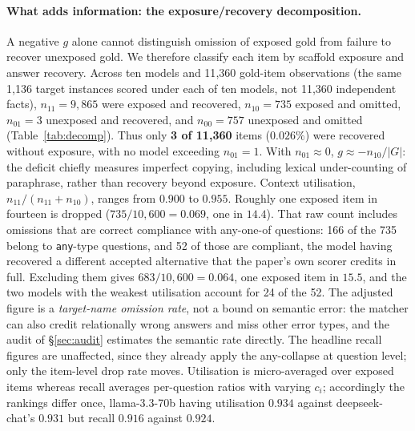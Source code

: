 \documentclass[10pt,twocolumn]{article}
\begin{document}
\paragraph{What adds information: the exposure/recovery decomposition.} A negative $g$ alone cannot distinguish omission of exposed gold from failure to recover unexposed gold. We therefore classify each item by scaffold exposure and answer recovery. Across ten models and 11{,}360 gold-item observations (the same 1{,}136 target instances scored under each of ten models, not 11{,}360 independent facts), $n_{11}=9{,}865$ were exposed and recovered, $n_{10}=735$ exposed and omitted, $n_{01}=3$ unexposed and recovered, and $n_{00}=757$ unexposed and omitted (Table~\ref{tab:decomp}). Thus only \textbf{3 of 11{,}360} items ($0.026\%$) were recovered without exposure, with no model exceeding $n_{01}=1$. With $n_{01}\approx0$, $g\approx-n_{10}/|G|$: the deficit chiefly measures imperfect copying, including lexical under-counting of paraphrase, rather than recovery beyond exposure. Context utilisation, $n_{11}/(n_{11}+n_{10})$, ranges from $0.900$ to $0.955$. Roughly one exposed item in fourteen is dropped ($735/10{,}600=0.069$, one in $14.4$). That raw count includes omissions that are correct compliance with any-one-of questions: 166 of the 735 belong to \texttt{any}-type questions, and 52 of those are compliant, the model having recovered a different accepted alternative that the paper's own scorer credits in full. Excluding them gives $683/10{,}600=0.064$, one exposed item in $15.5$, and the two models with the weakest utilisation account for 24 of the 52. The adjusted figure is a \emph{target-name omission rate}, not a bound on semantic error: the matcher can also credit relationally wrong answers and miss other error types, and the audit of \S\ref{sec:audit} estimates the semantic rate directly. The headline recall figures are unaffected, since they already apply the any-collapse at question level; only the item-level drop rate moves. Utilisation is micro-averaged over exposed items whereas recall averages per-question ratios with varying $c_i$; accordingly the rankings differ once, llama-3.3-70b having utilisation $0.934$ against deepseek-chat's $0.931$ but recall $0.916$ against $0.924$.
\end{document}
